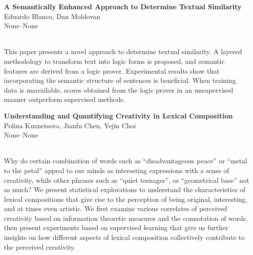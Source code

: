 \documentclass[twoside,makeidx]{book}
\renewcommand{\normalsize}{\fontsize{8}{9}\selectfont}
\renewcommand{\small}{\fontsize{7}{8}\selectfont}
\begin{document}
\par\vspace{2em}\noindent%
\begin{minipage}{\linewidth}%
\begin{center}
\textbf{\normalsize A Semantically Enhanced Approach to Determine Textual Similarity}\\
\normalsize  Eduardo Blanco,  Dan Moldovan\\
{\small None--None}\\
\end{center}
\end{minipage}\\[0.5em]
\nopagebreak%
\noindent%
{\small This paper presents a novel approach to determine textual similarity. A layered methodology to transform text into logic forms is proposed, and semantic features are derived from a logic prover. Experimental results show that incorporating the semantic structure of sentences is beneficial. When training data is unavailable, scores obtained from the logic prover in an unsupervised manner outperform supervised methods.}
\par\vspace{2em}\noindent%
\begin{minipage}{\linewidth}%
\begin{center}
\textbf{\normalsize Understanding and Quantifying Creativity in Lexical Composition}\\
\normalsize  Polina Kuznetsova,  Jianfu Chen,  Yejin Choi\\
{\small None--None}\\
\end{center}
\end{minipage}\\[0.5em]
\nopagebreak%
\noindent%
{\small Why do certain combination of words such as ``disadvantageous peace'' or ``metal to the petal'' appeal to our minds as interesting expressions with a sense of creativity, while other phrases such as ``quiet teenager'', or ``geometrical base'' not as much? We present statistical explorations to understand the characteristics of lexical compositions that give rise to the perception of being original, interesting, and at times even artistic. We first examine various correlates of perceived creativity based on information theoretic measures and the connotation of words, then present experiments based on supervised learning that give us further insights on how different aspects of lexical composition collectively contribute to the perceived creativity.}
\par\vspace{2em}\noindent%
\end{document}
